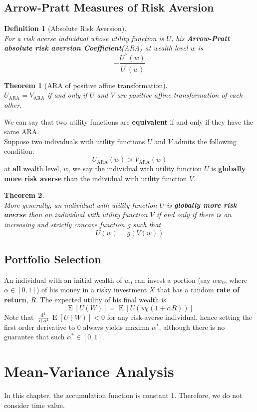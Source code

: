 \documentclass[12pt]{article}
\newtheorem{definition}{Definition}[section]
\newtheorem{theorem}{Theorem}[section]
\theoremstyle{definition}
\DeclareMathOperator{\diff}{d}
\DeclareMathOperator{\expec}{E}
\begin{document}
\subsection{Arrow-Pratt Measures of Risk Aversion}
\begin{definition}[Absolute Risk Aversion]
\hfill\\\normalfont For a \textit{risk averse} individual whose utility function is $U$, his \textbf{Arrow-Pratt absolute risk aversion Coefficient}(ARA) at wealth level $w$ is
\[
-\frac{U^{\prime\prime}(w)}{U^\prime(w)}
\]
\end{definition}
\begin{theorem}[ARA of positive affine transformation]
\hfill\\\normalfont $U_\text{ARA} = V_\text{ARA}$ if and only if $U$ and $V$ are positive affine transformation of each other.
\end{theorem}
We can say that two utility functions are \textbf{equivalent} if and only if they have the same ARA.\\
Suppose two individuals with utility functions $U$ and $V$ admits the following condition:
\[
U_\text{ARA}(w)>V_\text{ARA}(w)
\]
at \textbf{all} wealth level, $w$, we say the individual with utility function $U$ is \textbf{globally more risk averse} than the individual with utility function $V$.
\begin{theorem}
\hfill\\\normalfont More generally, an individual with utility function $U$ is \textbf{globally more risk averse} than an individual with utility function $V$ if and only if there is an increasing and strictly concave function $g$ such that
\[
U(w)=g(V(w))
\]
\end{theorem}
\subsection{Portfolio Selection}
An individual with an initial wealth of $w_0$ can invest a portion (say $\alpha w_0$, where $\alpha\in[0,1]$) of his money in a risky investment $X$ that has a random \textbf{rate of return}, $R$. The expected utility of his final wealth is
\[
\expec[U(W)]=\expec[U(w_0(1+\alpha R))]
\]
Note that $\frac{\diff^2}{\diff\alpha^2}\expec[U(W)]<0$ for any risk-averse individual, hence setting the first order derivative to 0 always yields maxima $\alpha^\ast$, although there is no guarantee that such $\alpha^\ast\in[0,1]$.
\clearpage
\section{Mean-Variance Analysis}
In this chapter, the accumulation function is constant 1. Therefore, we do not consider time value.
\end{document}

